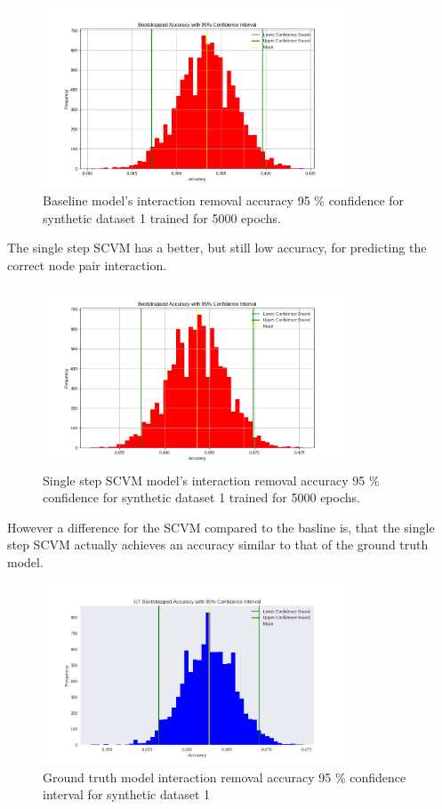 \begin{figure}[H]
    \centering
    \includegraphics[width=0.8\textwidth]{0_images/rq1_baseline_accuracy.png}
    \caption{Baseline model's interaction removal accuracy 95 \% confidence for synthetic dataset 1 trained for 5000 epochs.}
    \label{fig:RQ1:baseline_accuracy}
\end{figure}
\noindent 
The single step SCVM has a better, but still low accuracy, for predicting the correct node pair interaction.
\begin{figure}[H]
    \centering
    \includegraphics[width=0.8\textwidth]{0_images/rq1_SCVM_accuracy.png}
    \caption{Single step SCVM model's interaction removal accuracy 95 \% confidence for synthetic dataset 1 trained for 5000 epochs.}
    \label{fig:RQ1:SCVM_accuracy}
\end{figure}
\noindent
However a difference for the SCVM compared to the basline is, that the single step SCVM actually achieves an accuracy similar to that of the ground truth model.
\begin{figure}[H]
    \centering
    \includegraphics[width=0.8\textwidth]{0_images/rq1_GT_accuracy_SCVM.png}
    \caption{Ground truth model interaction removal accuracy 95 \% confidence interval for synthetic dataset 1}
\end{figure}
